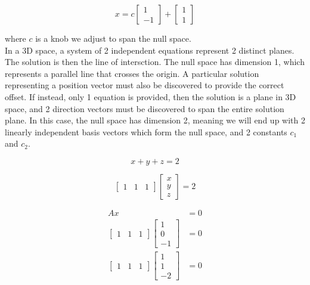 \documentclass[11pt,a4paper]{article}
\begin{document}
\begin{equation}
    x =
    c \begin{bmatrix} 1 \\ -1\end{bmatrix}
        + \begin{bmatrix} 1 \\ 1\end{bmatrix}
\end{equation}

where \(c\) is a knob we adjust to span the null space. \\

In a 3D space, a system of 2 independent equations represent 2 distinct planes. The solution is then the line of intersction. The null space has dimension 1, which represents a parallel line that crosses the origin. A particular solution representing a position vector must also be discovered to provide the correct offset. If instead, only 1 equation is provided, then the solution is a plane in 3D space, and 2 direction vectors must be discovered to span the entire solution plane. In this case, the null space has dimension 2, meaning we will end up with 2 linearly independent basis vectors which form the null space, and 2 constants \(c_1\) and \(c_2\).

\begin{equation}
    x + y + z = 2
\end{equation}

\begin{equation}
    \begin{bmatrix}
        1 & 1 & 1
    \end{bmatrix}
    \begin{bmatrix}
        x \\ y \\ z
    \end{bmatrix}
    = 2
\end{equation}

\begin{align}
    Ax &= 0 \\
    \begin{bmatrix}
        1 & 1 & 1
    \end{bmatrix}
    \begin{bmatrix}
        1 \\ 0 \\ -1
    \end{bmatrix}
    &= 0 \\
    \begin{bmatrix}
        1 & 1 & 1
    \end{bmatrix}
    \begin{bmatrix}
        1 \\ 1 \\ -2
    \end{bmatrix}
    &= 0
\end{align}
\end{document}
